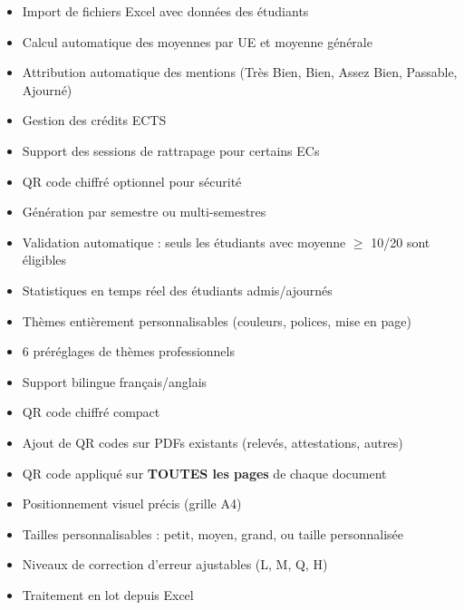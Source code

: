 \begin{description}[leftmargin=3cm, style=nextline]
    \item[Relevés de notes]
    \begin{itemize}
        \item Import de fichiers Excel avec données des étudiants
        \item Calcul automatique des moyennes par UE et moyenne générale
        \item Attribution automatique des mentions (Très Bien, Bien, Assez Bien, Passable, Ajourné)
        \item Gestion des crédits ECTS
        \item Support des sessions de rattrapage pour certains ECs
        \item QR code chiffré optionnel pour sécurité
        \item Génération par semestre ou multi-semestres
    \end{itemize}

    \item[Attestations de réussite]
    \begin{itemize}
        \item Validation automatique : seuls les étudiants avec moyenne $\geq$ 10/20 sont éligibles
        \item Statistiques en temps réel des étudiants admis/ajournés
        \item Thèmes entièrement personnalisables (couleurs, polices, mise en page)
        \item 6 préréglages de thèmes professionnels
        \item Support bilingue français/anglais
        \item QR code chiffré compact
    \end{itemize}

    \item[Codes QR sur documents]
    \begin{itemize}
        \item Ajout de QR codes sur PDFs existants (relevés, attestations, autres)
        \item QR code appliqué sur \textbf{TOUTES les pages} de chaque document
        \item Positionnement visuel précis (grille A4)
        \item Tailles personnalisables : petit, moyen, grand, ou taille personnalisée
        \item Niveaux de correction d'erreur ajustables (L, M, Q, H)
        \item Traitement en lot depuis Excel
    \end{itemize}
\end{description}


